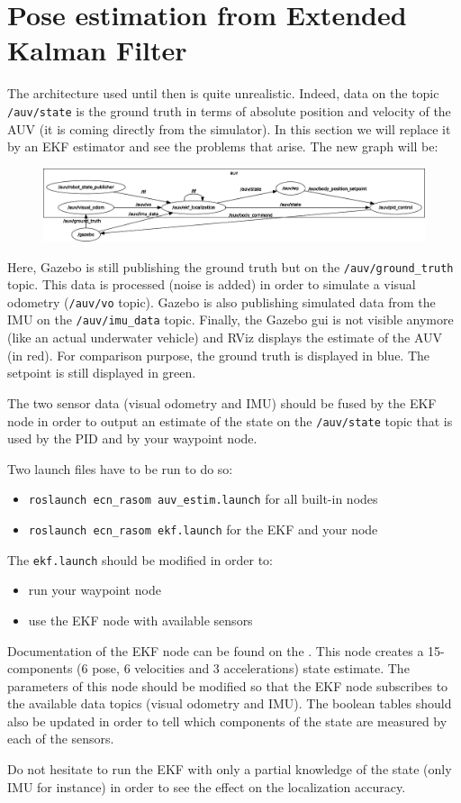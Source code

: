 \documentclass{ecnreport}
\begin{document}
\section{Pose estimation from Extended Kalman Filter}

The architecture used until then is quite unrealistic.
Indeed, data on the topic \texttt{/auv/state} is the ground truth in terms of absolute position and velocity of the AUV (it is coming
directly from the simulator).
In this section we will replace it by an EKF estimator and see the problems that arise. The new graph will be:
\begin{figure}[h]\centering
 \includegraphics[width=\linewidth]{graph_ekf}
\end{figure}

Here, Gazebo is still publishing the ground truth but on the \texttt{/auv/ground\_truth} topic. This data is processed (noise is added)
in order to simulate a visual odometry (\texttt{/auv/vo} topic). 
Gazebo is also publishing simulated data from the IMU on the \texttt{/auv/imu\_data} topic. 
Finally, the Gazebo gui is not visible anymore (like an actual underwater vehicle) and RViz displays the estimate of the AUV (in red). 
For comparison purpose, the ground truth is displayed in blue. The setpoint is still displayed in green.

The two sensor data (visual odometry and IMU) should be fused by the EKF node in order to output an estimate of the state on the \texttt{/auv/state} topic 
that is used by the PID and by your waypoint node.

Two launch files have to be run to do so:
\begin{itemize}
 \item \texttt{roslaunch ecn\_rasom auv\_estim.launch} for all built-in nodes
 \item \texttt{roslaunch ecn\_rasom ekf.launch} for the EKF and your node
\end{itemize}

The \texttt{ekf.launch} should be modified in order to:
\begin{itemize}
 \item run your waypoint node
 \item use the EKF node with available sensors
\end{itemize}
Documentation of the EKF node can be found on the .
This node creates a 15-components (6 pose, 6 velocities and 3 accelerations) state estimate.
The parameters of this node should be modified so that the EKF node
subscribes to the available data topics (visual odometry and IMU). The boolean tables should
also be updated in order to tell which components of the state are measured by each of the sensors. 

Do not hesitate to run the EKF with only a partial knowledge of the state (only IMU for instance) in order to see the effect on the localization accuracy.
\end{document}
